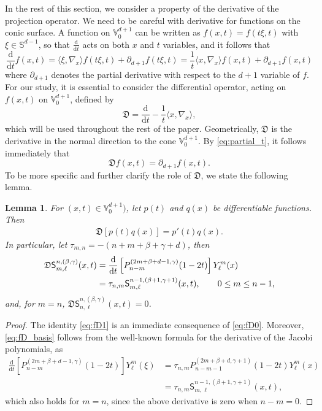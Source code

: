 \documentclass{amsart}
\newtheorem{lem}[thm]{Lemma}
\theoremstyle{remark}
\def\la{{\langle}}
\def\ra{{\rangle}}
\def\d{\mathrm{d}}
\def\sph{{\mathbb{S}^{d-1}}}
\def\sS{{\mathsf S}}
\def\fD{{\mathfrak D}}
\def\b{{\beta}}
\def\g{{\gamma}}
\def\la{{\langle}}
\def\ra{{\rangle}}
\def\VV{{\mathbb V}}
\begin{document}
In the rest of this section, we consider a property of the derivative of the projection operator. We need to be careful with
derivative for functions on the conic surface. A function on $\VV_0^{d+1}$ can be written as $f(x,t) = f(t \xi, t)$ with $\xi \in \sph$, 
so that $\frac{\d}{\d t}$ acts on both $x$ and $t$ variables, and it follows that
\begin{equation} \label{eq:partial_t}
  \frac{\d}{\d t} f(x,t)  =  \la \xi, \nabla_x\ra f(t\xi,t) + \partial_{d+1} f(t\xi,t) = \frac{1}{t} \la x, \nabla_x\ra  f(x,t) 
    +  \partial_{d+1} f(x,t)
\end{equation}
where $\partial_{d+1}$ denotes the partial derivative with respect to the $d+1$ variable of $f$. For our study, it is 
essential to consider the differential operator, acting on $f(x,t)$ on $\VV_0^{d+1}$, defined by
\begin{equation} \label{eq:fD}
   \fD =  \frac{\d}{\d t} - \frac{1}{t}  \la x, \nabla_x\ra, %
\end{equation}
which will be used throughout the rest of the paper. Geometrically, $\fD$ is the derivative in the normal direction to 
the cone $\VV_0^{d+1}$. By \eqref{eq:partial_t}, it follows immediately that
\begin{equation} \label{eq:fD0}
  \fD f(x,t) = \partial_{d+1} f(x,t). 
\end{equation}
To be more specific and further clarify the role of $\fD$, we state the following lemma. 

\begin{lem} \label{lem:fD}
For $(x,t) \in \VV_0^{d+1})$, let $p(t)$ and $q(x)$ be differentiable functions. Then 
\begin{align} \label{eq:fD1}
     \fD \left[p(t) q(x)\right] = p'(t) q(x). 
\end{align}
In particular, let $ \tau_{m,n} = - (n+m + \b+ \g + d)$, then
\begin{align} \label{eq:fD_basis}
     \fD \sS_{m,\ell}^{n,(\b,\g)}(x,t) & = \frac{\d}{\d t} \left[P_{n-m}^{(2m + \b + d-1,\g)} (1-2t)\right] Y_\ell^m(x) \\ 
       & =  \tau_{n,m} \sS_{m,\ell}^{n-1,(\b+1,\g+1)}(x,t), \qquad 0 \le m \le n-1,  \notag
\end{align}
and, for $m = n$, $\fD \sS_{n,\ell}^{n,(\b,\g)}(x,t) = 0$. 
\end{lem}

\begin{proof}
The identity \eqref{eq:fD1} is an immediate consequence of \eqref{eq:fD0}. Moreover, \eqref{eq:fD_basis} follows from the well-known 
formula for the derivative of the Jacobi polynomials, as
\begin{align*}
 \frac{\d}{\d t} \left[ P_{n-m}^{(2m + \b + d-1,\g)} (1-2t)\right] Y_\ell^m (\xi) 
   & = \tau_{n,m} P_{n-m-1}^{(2m + \b + d,\g+1)} (1-2t) Y_\ell^m (x) \\& = \tau_{n,m} \sS_{m,\ell}^{n-1,(\b+1,\g+1)}(x,t),
\end{align*}
which also holds for $m=n$, since the above derivative is zero when $n-m=0$.
\end{proof}
\end{document}
